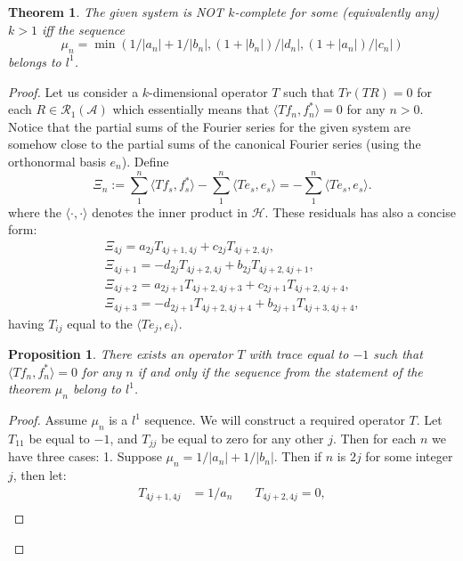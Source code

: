 \documentclass[12pt]{article}
\renewcommand{\cal}[1]{\mathcal{#1}}
\newtheorem{theorem}{Theorem}
\newtheorem{prop}{Proposition}
\theoremstyle{definition}
\numberwithin{remark}{section}
\numberwithin{theorem}{section}
\numberwithin{prop}{section}
\numberwithin{equation}{section}
\numberwithin{lemma}{section}
\numberwithin{prop_under_lemma}{lemma}
\begin{document}
    \begin{theorem}
        The given system is NOT $k$-complete for some (equivalently any) $k > 1$ iff the sequence
        $$
            \mu_n = \min(1/|a_n| + 1/|b_n|, (1 + |b_n|)/|d_n|, (1 + |a_n|)/|c_n|)
        $$ belongs to $l^1$.
    \end{theorem}
    \begin{proof}
        Let us consider a $k$-dimensional operator $T$ such that 
        $Tr(TR) = 0$ for each $R \in \cal{R}_1(\cal{A})$ which essentially means that
        $\langle Tf_n, f_n^* \rangle = 0$ for any $n > 0$. 
        Notice that the partial sums of the Fourier series for the given system are somehow close to the
        partial sums of the canonical Fourier series (using the orthonormal basis $e_n$). Define
        $$
          \Xi_n := \sum_1^n \langle Tf_s, f_s^* \rangle - \sum_1^n \langle Te_s, e_s \rangle = -\sum_1^n \langle Te_s, e_s \rangle.
        $$
        where the $\langle \cdot, \cdot\rangle$ denotes the inner product in $\cal{H}$.
        These residuals has also a concise form:
        \begin{align*}
            \Xi_{4j} = a_{2j} T_{4j+1, 4j} + c_{2j} T_{4j+2, 4j},\\
            \Xi_{4j + 1} = -d_{2j} T_{4j+2, 4j} + b_{2j} T_{4j+2, 4j+1},\\
            \Xi_{4j + 2} = a_{2j+1} T_{4j+2, 4j+3} + c_{2j+1} T_{4j+2, 4j+4},\\
            \Xi_{4j + 3} = -d_{2j+1} T_{4j+2, 4j+4} + b_{2j+1} T_{4j+3, 4j+4},
        \end{align*}
        having $T_{ij}$ equal to the $\langle Te_j, e_i\rangle$.
        \begin{prop}
            \label{inf-dim-statement}
            There exists an operator $T$ with trace equal to $-1$ such that
            $\langle Tf_n, f_n^*\rangle = 0$ for any $n$ if and only if the
            sequence from the statement of the theorem $\mu_n$ belong to $l^1$.
        \end{prop}
        \begin{proof}
            Assume $\mu_n$ is a $l^1$ sequence. We will construct a required operator $T$.
            Let $T_{11}$ be equal to $-1$, and $T_{jj}$ be equal to zero for any other $j$.
            Then for each $n$ we have three cases:
            1. Suppose $\mu_n = 1/|a_n| + 1/|b_n|$. Then if $n$ is $2j$ for some integer $j$, then
            let:
            \begin{align*}
                T_{4j+1,4j}&=1/a_n & \quad T_{4j+2,4j} = 0,\\

\end{align*}
\end{proof}
\end{proof}
\end{document}
